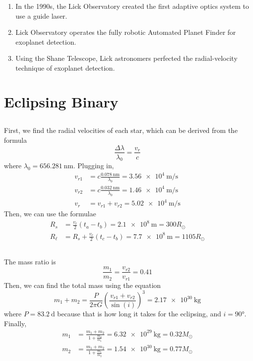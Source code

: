 \documentclass{article}
\begin{document}
\begin{enumerate}
    \item In the 1990s, the Lick Observatory created the first adaptive optics system to use a guide laser.
    \item Lick Observatory operates the fully robotic Automated Planet Finder for exoplanet detection.
    \item Using the Shane Telescope, Lick astronomers perfected the radial-velocity technique of exoplanet detection.
\end{enumerate}

\section{Eclipsing Binary}

\subsection{}

First, we find the radial velocities of each star, which can be derived from the formula
\begin{equation}
    \frac{\Delta \lambda}{\lambda_0} = \frac{v_r}{c}
\end{equation}
where \(\lambda_0 = \SI{656.281}{\nano\meter}\).
Plugging in,
\begin{align}
    v_{r1} &= c \frac{\SI{0.078}{\nano\meter}}{\lambda_0} = \SI{3.56e+4}{\meter\per\second} \\
    v_{r2} &= c \frac{\SI{0.032}{\nano\meter}}{\lambda_0} = \SI{1.46e+4}{\meter\per\second} \\
    v_r &= v_{r1} + v_{r2} = \SI{5.02e+4}{\meter\per\second}
\end{align}
Then, we can use the formulae
\begin{align}
    R_s &= \frac{v_r}{2} (t_a - t_b) = \SI{2.1e+8}{\meter} = \num{300} R_\odot \\
    R_\ell &= R_s + \frac{v_r}{2} (t_c - t_b) = \SI{7.7e+8}{\meter} = \num{1105} R_\odot 
\end{align}

\subsection{}

The mass ratio is
\begin{equation}
    \frac{m_1}{m_2} = \frac{v_{r2}}{v_{r1}} = \num{0.41}
\end{equation}
Then, we can find the total mass using the equation
\begin{equation}
    m_1 + m_2 = \frac{P}{2 \pi G} \left(\frac{v_{r1} + v_{r2}}{\sin(i)}\right)^3 = \SI{2.17e+30}{\kilogram}
\end{equation}
where \(P = \SI{83.2}{\day}\) because that is how long it takes for the eclipsing, and \(i = \ang{90}\).
Finally,
\begin{align}
    m_1 &= \frac{m_1 + m_2}{1 + \frac{m_2}{m_1}} = \SI{6.32e+29}{\kilogram} = 0.32 M_\odot \\
    m_2 &= \frac{m_1 + m_2}{1 + \frac{m_1}{m_2}} = \SI{1.54e+30}{\kilogram} = 0.77 M_\odot
\end{align}
\end{document}
